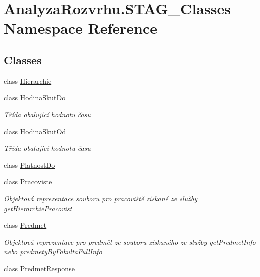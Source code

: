 \hypertarget{namespace_analyza_rozvrhu_1_1_s_t_a_g___classes}{}\section{Analyza\+Rozvrhu.\+S\+T\+A\+G\+\_\+\+Classes Namespace Reference}
\label{namespace_analyza_rozvrhu_1_1_s_t_a_g___classes}
\subsection*{Classes}
\begin{DoxyCompactItemize}
\item 
class \hyperlink{class_analyza_rozvrhu_1_1_s_t_a_g___classes_1_1_hierarchie}{Hierarchie}
\item 
class \hyperlink{class_analyza_rozvrhu_1_1_s_t_a_g___classes_1_1_hodina_skut_do}{Hodina\+Skut\+Do}
\begin{DoxyCompactList}\small\item\em Třída obalující hodnotu času \end{DoxyCompactList}\item 
class \hyperlink{class_analyza_rozvrhu_1_1_s_t_a_g___classes_1_1_hodina_skut_od}{Hodina\+Skut\+Od}
\begin{DoxyCompactList}\small\item\em Třída obalující hodnotu času \end{DoxyCompactList}\item 
class \hyperlink{class_analyza_rozvrhu_1_1_s_t_a_g___classes_1_1_platnost_do}{Platnost\+Do}
\item 
class \hyperlink{class_analyza_rozvrhu_1_1_s_t_a_g___classes_1_1_pracoviste}{Pracoviste}
\begin{DoxyCompactList}\small\item\em Objektová reprezentace souboru pro pracoviště získané ze služby get\+Hierarchie\+Pracovist \end{DoxyCompactList}\item 
class \hyperlink{class_analyza_rozvrhu_1_1_s_t_a_g___classes_1_1_predmet}{Predmet}
\begin{DoxyCompactList}\small\item\em Objektová reprezentace pro predmět ze souboru získaného ze služby get\+Predmet\+Info nebo predmety\+By\+Fakulta\+Full\+Info \end{DoxyCompactList}\item 
class \hyperlink{class_analyza_rozvrhu_1_1_s_t_a_g___classes_1_1_predmet_response}{Predmet\+Response}

\end{DoxyCompactItemize}
